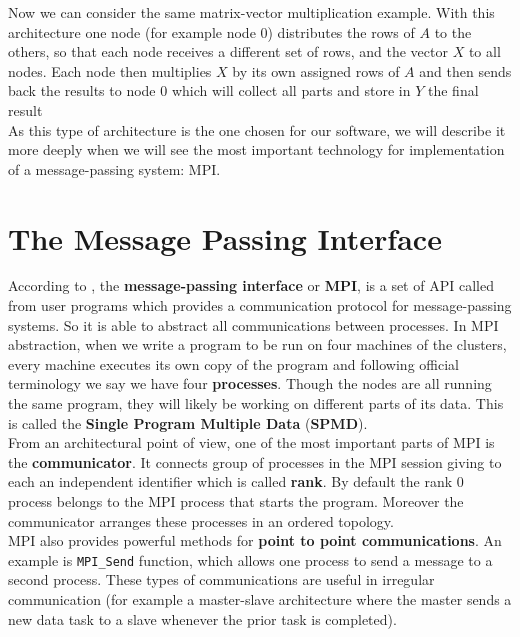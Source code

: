 Now we can consider the same matrix-vector multiplication example. With this architecture one node (for example node $0$) distributes the rows of $A$ to the others, so that each node receives a different set of rows, and the vector $X$ to all nodes. Each node then multiplies $X$ by its own assigned rows of $A$ and then sends back the results to node $0$ which will collect all parts and store in $Y$ the final result\\

As this type of architecture is the one chosen for our software, we will describe it more deeply when we will see the most important technology for implementation of a message-passing system: MPI.

\section{The Message Passing Interface}\label{sec22:MPI}

According to \cite{Matloff}, the \textbf{message-passing interface} or \textbf{MPI}, is a set of API called from user programs which provides a communication protocol for message-passing systems. So it is able to abstract all communications between processes. In MPI abstraction, when we write a program to be run on four machines of the clusters, every machine  executes its own copy of the program and following official terminology we say we have four \textbf{processes}. Though the nodes are all running the same program, they will likely be working on different parts of its data. This is called the \textbf{Single Program Multiple Data} (\textbf{SPMD}).\\

From an architectural point of view, one of the most important parts of MPI is the \textbf{communicator}. It connects group of processes in the MPI session giving to each an independent identifier which is called \textbf{rank}. By default the rank 0 process belongs to the MPI process that starts the program. Moreover the communicator arranges these processes in an ordered topology.\\

MPI also provides powerful methods for \textbf{point to point communications}. An example is \texttt{MPI\_Send} function, which allows one process to send a message to a second process. These types of communications are useful in irregular communication (for example a master-slave architecture where the master sends a new data task to a slave whenever the prior task is completed).\\

